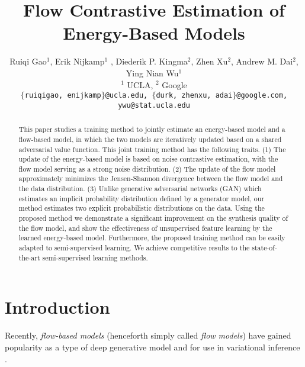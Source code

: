 \documentclass[10pt,twocolumn,letterpaper]{article}
\begin{document}
\title{Flow Contrastive Estimation of Energy-Based Models}

\author{Ruiqi Gao$^{1}$, Erik Nijkamp$^{1}$ , Diederik P. Kingma$^{2}$, Zhen Xu$^{2}$, Andrew M. Dai$^{2}$, Ying Nian Wu$^{1}$\\
$^{1}$ UCLA, $^{2}$ Google \\ {\tt\small $\{$ruiqigao, enijkamp$\}$@ucla.edu, $\{$durk, zhenxu, adai$\}$@google.com, ywu@stat.ucla.edu}\\
}



\maketitle
\begin{abstract}
   This paper studies a training method to jointly estimate an energy-based model and a flow-based model, in which the two models are iteratively updated based on a shared adversarial value function. This joint training method has the following traits. (1) The update of the energy-based model is based on noise contrastive estimation, with the flow model serving as a strong noise distribution. (2) The update of the flow model approximately minimizes the Jensen-Shannon divergence between the flow model and the data distribution. (3) Unlike generative adversarial networks (GAN) which estimates an implicit probability distribution defined by a generator model, our method estimates two explicit probabilistic distributions on the data. Using the proposed method we demonstrate a significant improvement on the synthesis quality of the flow model, and show the effectiveness of unsupervised feature learning by the learned energy-based model. Furthermore, the proposed training method can be easily adapted to semi-supervised learning. We achieve competitive results to the state-of-the-art semi-supervised learning methods.
\end{abstract}

\section{Introduction}
Recently, \emph{flow-based models} (henceforth simply called \emph{flow models}) have gained popularity as a type of deep generative model \cite{dinh2014nice,dinh2016density, kingma2018Glow,grathwohl2018ffjord,behrmann2018invertible, kumar2019videoflow, tran2019discrete,durkan2019neural} and for use in variational inference \cite{kingma2013auto,rezende2015variational, kingma2016improved}. 
\end{document}
